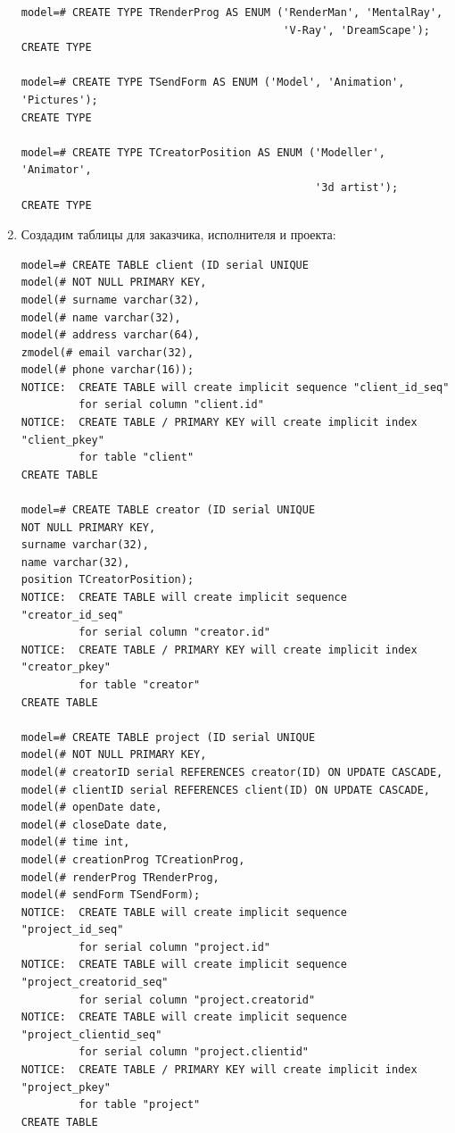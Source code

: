 \documentclass[a4paper, 12pt, titlepage]{article}
\begin{document}
\begin{otherlanguage}{russian}
\begin{enumerate}
{\begin{verbatim}
model=# CREATE TYPE TRenderProg AS ENUM ('RenderMan', 'MentalRay', 
                                         'V-Ray', 'DreamScape');
CREATE TYPE

model=# CREATE TYPE TSendForm AS ENUM ('Model', 'Animation', 'Pictures');
CREATE TYPE

model=# CREATE TYPE TCreatorPosition AS ENUM ('Modeller', 'Animator', 
                                              '3d artist');
CREATE TYPE
\end{verbatim}}

\newpage

\item Создадим таблицы для заказчика, исполнителя и проекта:
{\small
\begin{verbatim}
model=# CREATE TABLE client (ID serial UNIQUE
model(# NOT NULL PRIMARY KEY,
model(# surname varchar(32),
model(# name varchar(32),
model(# address varchar(64),
zmodel(# email varchar(32),
model(# phone varchar(16));
NOTICE:  CREATE TABLE will create implicit sequence "client_id_seq" 
         for serial column "client.id"
NOTICE:  CREATE TABLE / PRIMARY KEY will create implicit index "client_pkey" 
         for table "client"
CREATE TABLE

model=# CREATE TABLE creator (ID serial UNIQUE
NOT NULL PRIMARY KEY,
surname varchar(32),
name varchar(32),
position TCreatorPosition);
NOTICE:  CREATE TABLE will create implicit sequence "creator_id_seq" 
         for serial column "creator.id"
NOTICE:  CREATE TABLE / PRIMARY KEY will create implicit index "creator_pkey" 
         for table "creator"
CREATE TABLE

model=# CREATE TABLE project (ID serial UNIQUE
model(# NOT NULL PRIMARY KEY,
model(# creatorID serial REFERENCES creator(ID) ON UPDATE CASCADE,
model(# clientID serial REFERENCES client(ID) ON UPDATE CASCADE,
model(# openDate date,
model(# closeDate date,
model(# time int,
model(# creationProg TCreationProg,
model(# renderProg TRenderProg,
model(# sendForm TSendForm);
NOTICE:  CREATE TABLE will create implicit sequence "project_id_seq" 
         for serial column "project.id"
NOTICE:  CREATE TABLE will create implicit sequence "project_creatorid_seq" 
         for serial column "project.creatorid"
NOTICE:  CREATE TABLE will create implicit sequence "project_clientid_seq" 
         for serial column "project.clientid"
NOTICE:  CREATE TABLE / PRIMARY KEY will create implicit index "project_pkey" 
         for table "project"
CREATE TABLE 
\end{verbatim}}


\end{enumerate}
\end{otherlanguage}
\end{document}
